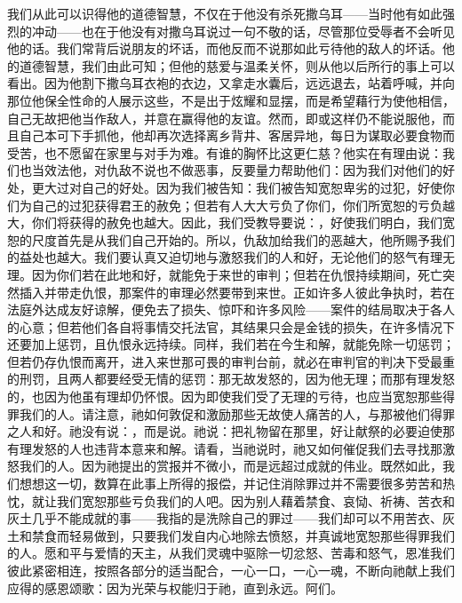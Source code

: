 我们从此可以识得他的道德智慧，不仅在于他没有杀死撒乌耳——当时他有如此强烈的冲动——也在于他没有对撒乌耳说过一句不敬的话，尽管那位受辱者不会听见他的话。我们常背后说朋友的坏话，而他反而不说那如此亏待他的敌人的坏话。他的道德智慧，我们由此可知；但他的慈爱与温柔关怀，则从他以后所行的事上可以看出。因为他割下撒乌耳衣袍的衣边，又拿走水囊后，远远退去，站着呼喊，并向那位他保全性命的人展示这些，不是出于炫耀和显摆，而是希望藉行为使他相信，自己无故把他当作敌人，并意在赢得他的友谊。然而，即或这样仍不能说服他，而且自己本可下手抓他，他却再次选择离乡背井、客居异地，每日为谋取必要食物而受苦，也不愿留在家里与对手为难。有谁的胸怀比这更仁慈？他实在有理由说：我们也当效法他，对仇敌不说也不做恶事，反要量力帮助他们：因为我们对他们的好处，更大过对自己的好处。因为我们被告知：我们被告知宽恕卑劣的过犯，好使你们为自己的过犯获得君王的赦免；但若有人大大亏负了你们，你们所宽恕的亏负越大，你们将获得的赦免也越大。因此，我们受教导要说：，好使我们明白，我们宽恕的尺度首先是从我们自己开始的。所以，仇敌加给我们的恶越大，他所赐予我们的益处也越大。我们要认真又迫切地与激怒我们的人和好，无论他们的怒气有理无理。因为你们若在此地和好，就能免于来世的审判；但若在仇恨持续期间，死亡突然插入并带走仇恨，那案件的审理必然要带到来世。正如许多人彼此争执时，若在法庭外达成友好谅解，便免去了损失、惊吓和许多风险——案件的结局取决于各人的心意；但若他们各自将事情交托法官，其结果只会是金钱的损失，在许多情况下还要加上惩罚，且仇恨永远持续。同样，我们若在今生和解，就能免除一切惩罚；但若仍存仇恨而离开，进入来世那可畏的审判台前，就必在审判官的判决下受最重的刑罚，且两人都要经受无情的惩罚：那无故发怒的，因为他无理；而那有理发怒的，也因为他虽有理却仍怀恨。因为即使我们受了无理的亏待，也应当宽恕那些得罪我们的人。请注意，祂如何敦促和激励那些无故使人痛苦的人，与那被他们得罪之人和好。祂没有说：，而是说。祂说：把礼物留在那里，好让献祭的必要迫使那有理发怒的人也违背本意来和解。请看，当祂说时，祂又如何催促我们去寻找那激怒我们的人。因为祂提出的赏报并不微小，而是远超过成就的伟业。既然如此，我们想想这一切，数算在此事上所得的报偿，并记住消除罪过并不需要很多劳苦和热忱，就让我们宽恕那些亏负我们的人吧。因为别人藉着禁食、哀恸、祈祷、苦衣和灰土几乎不能成就的事——我指的是洗除自己的罪过——我们却可以不用苦衣、灰土和禁食而轻易做到，只要我们发自内心地除去愤怒，并真诚地宽恕那些得罪我们的人。愿和平与爱情的天主，从我们灵魂中驱除一切忿怒、苦毒和怒气，恩准我们彼此紧密相连，按照各部分的适当配合，一心一口，一心一魂，不断向祂献上我们应得的感恩颂歌：因为光荣与权能归于祂，直到永远。阿们。\par

